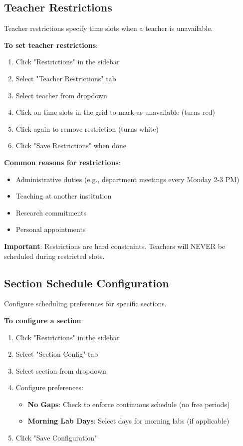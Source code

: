 \documentclass[12pt,a4paper]{article}
\begin{document}
\subsection{Teacher Restrictions}

Teacher restrictions specify time slots when a teacher is unavailable.

\textbf{To set teacher restrictions}:
\begin{enumerate}
\item Click "Restrictions" in the sidebar
\item Select "Teacher Restrictions" tab
\item Select teacher from dropdown
\item Click on time slots in the grid to mark as unavailable (turns red)
\item Click again to remove restriction (turns white)
\item Click "Save Restrictions" when done
\end{enumerate}

\textbf{Common reasons for restrictions}:
\begin{itemize}
\item Administrative duties (e.g., department meetings every Monday 2-3 PM)
\item Teaching at another institution
\item Research commitments
\item Personal appointments
\end{itemize}

\textbf{Important}: Restrictions are hard constraints. Teachers will NEVER be scheduled during restricted slots.

\subsection{Section Schedule Configuration}

Configure scheduling preferences for specific sections.

\textbf{To configure a section}:
\begin{enumerate}
\item Click "Restrictions" in the sidebar
\item Select "Section Config" tab
\item Select section from dropdown
\item Configure preferences:
\begin{itemize}
\item \textbf{No Gaps}: Check to enforce continuous schedule (no free periods)
\item \textbf{Morning Lab Days}: Select days for morning labs (if applicable)
\end{itemize}
\item Click "Save Configuration"
\end{enumerate}
\end{document}
